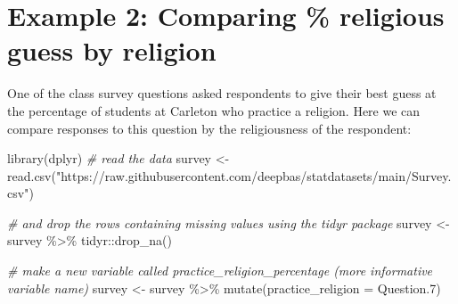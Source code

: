 \documentclass[
]{book}
\newenvironment{Shaded}{\begin{snugshade}}{\end{snugshade}}
\newcommand{\AttributeTok}[1]{\textcolor[rgb]{0.77,0.63,0.00}{#1}}
\newcommand{\CommentTok}[1]{\textcolor[rgb]{0.56,0.35,0.01}{\textit{#1}}}
\newcommand{\FloatTok}[1]{\textcolor[rgb]{0.00,0.00,0.81}{#1}}
\newcommand{\FunctionTok}[1]{\textcolor[rgb]{0.00,0.00,0.00}{#1}}
\newcommand{\NormalTok}[1]{#1}
\newcommand{\OtherTok}[1]{\textcolor[rgb]{0.56,0.35,0.01}{#1}}
\newcommand{\SpecialCharTok}[1]{\textcolor[rgb]{0.00,0.00,0.00}{#1}}
\newcommand{\StringTok}[1]{\textcolor[rgb]{0.31,0.60,0.02}{#1}}
\begin{document}
\hypertarget{example-2-comparing-religious-guess-by-religion}{%
\section{Example 2: Comparing \% religious guess by religion}\label{example-2-comparing-religious-guess-by-religion}}

One of the class survey questions asked respondents to give their best guess at the percentage of students at Carleton who practice a religion. Here we can compare responses to this question by the religiousness of the respondent:

\begin{Shaded}
\begin{Highlighting}[]
\FunctionTok{library}\NormalTok{(dplyr)}
\CommentTok{\# read the data }
\NormalTok{survey }\OtherTok{\textless{}{-}} \FunctionTok{read.csv}\NormalTok{(}\StringTok{"https://raw.githubusercontent.com/deepbas/statdatasets/main/Survey.csv"}\NormalTok{) }

\CommentTok{\# and drop the rows containing missing values using the tidyr package}
\NormalTok{survey }\OtherTok{\textless{}{-}}\NormalTok{ survey }\SpecialCharTok{\%\textgreater{}\%}\NormalTok{ tidyr}\SpecialCharTok{::}\FunctionTok{drop\_na}\NormalTok{()}

\CommentTok{\# make a new variable called \textasciigrave{}practice\_religion\_percentage\textasciigrave{} (more informative variable name)}
\NormalTok{survey }\OtherTok{\textless{}{-}}\NormalTok{ survey }\SpecialCharTok{\%\textgreater{}\%}  \FunctionTok{mutate}\NormalTok{(}\AttributeTok{practice\_religion =}\NormalTok{ Question}\FloatTok{.7}\NormalTok{)}


\end{Highlighting}
\end{Shaded}
\end{document}
